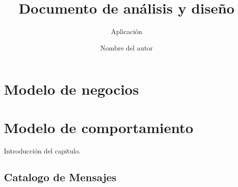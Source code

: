 \documentclass[oneside,10pt]{book}
\title{Documento de análisis y diseño}
\subtitle{Aplicación}
\author{Nombre del autor}
\begin{document}
\maketitle
\frontmatter
\tableofcontents
\mainmatter
\chapter{Modelo de negocios}
\newpage
\chapter{Modelo de comportamiento}
Introducción del capitulo. 




\newpage
\section{Catalogo de Mensajes}
\end{document}
